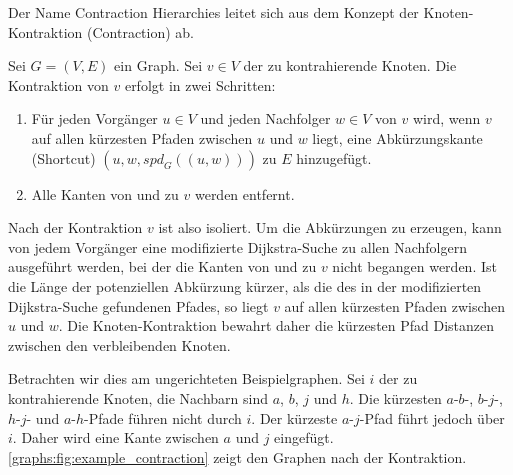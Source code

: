 Der Name Contraction Hierarchies leitet sich aus dem Konzept der Knoten-Kontraktion (Contraction) ab.

\begin{definition}
  Sei $G = (V, E)$ ein Graph. Sei $v \in V$ der zu kontrahierende Knoten. Die Kontraktion von $v$ erfolgt in zwei Schritten:

  \begin{enumerate}
    \item\label{ch:contraction:when_shortcut}
      Für jeden Vorgänger $u \in V$ und jeden Nachfolger $w \in V$ von $v$ wird, wenn $v$ auf allen kürzesten Pfaden zwischen $u$ und $w$ liegt, eine Abkürzungskante (Shortcut) $(u, w, {spd}_G((u, w)))$ zu $E$ hinzugefügt.

    \item
      Alle Kanten von und zu $v$ werden entfernt.
  \end{enumerate}
\end{definition}

Nach der Kontraktion $v$ ist also isoliert.
Um die Abkürzungen zu erzeugen, kann von jedem Vorgänger eine modifizierte Dijkstra-Suche zu allen Nachfolgern ausgeführt werden, bei der die Kanten von und zu $v$ nicht begangen werden.
Ist die Länge der potenziellen Abkürzung kürzer, als die des in der modifizierten Dijkstra-Suche gefundenen Pfades, so liegt $v$ auf allen kürzesten Pfaden zwischen $u$ und $w$.
Die Knoten-Kontraktion bewahrt daher die kürzesten Pfad Distanzen zwischen den verbleibenden Knoten.


Betrachten wir dies am ungerichteten Beispielgraphen.
Sei $i$ der zu kontrahierende Knoten, die Nachbarn sind $a$, $b$, $j$ und $h$.
Die kürzesten $a$-$b$-, $b$-$j$-, $h$-$j$- und $a$-$h$-Pfade führen nicht durch $i$.
Der kürzeste $a$-$j$-Pfad führt jedoch über $i$.
Daher wird eine Kante zwischen $a$ und $j$ eingefügt.
\autoref{graphs:fig:example_contraction} zeigt den Graphen nach der Kontraktion.

